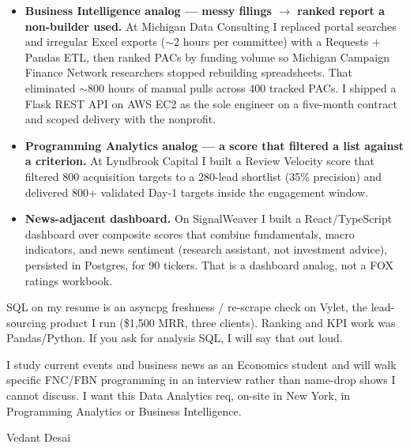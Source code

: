 \documentclass[11pt]{article}
\begin{document}
\begin{itemize}\setlength{\itemsep}{0.35em}\setlength{\parskip}{0pt}
\item \textbf{Business Intelligence analog --- messy filings $\rightarrow$ ranked report a non-builder used.} At Michigan Data Consulting I replaced portal searches and irregular Excel exports ($\sim$2 hours per committee) with a Requests + Pandas ETL, then ranked PACs by funding volume so Michigan Campaign Finance Network researchers stopped rebuilding spreadsheets. That eliminated $\sim$800 hours of manual pulls across 400 tracked PACs. I shipped a Flask REST API on AWS EC2 as the sole engineer on a five-month contract and scoped delivery with the nonprofit.

\item \textbf{Programming Analytics analog --- a score that filtered a list against a criterion.} At Lyndbrook Capital I built a Review Velocity score that filtered 800 acquisition targets to a 280-lead shortlist (35\% precision) and delivered 800+ validated Day-1 targets inside the engagement window.

\item \textbf{News-adjacent dashboard.} On SignalWeaver I built a React/TypeScript dashboard over composite scores that combine fundamentals, macro indicators, and news sentiment (research assistant, not investment advice), persisted in Postgres, for 90 tickers. That is a dashboard analog, not a FOX ratings workbook.
\end{itemize}

SQL on my resume is an asyncpg freshness / re-scrape check on Vylet, the lead-sourcing product I run (\$1,500 MRR, three clients). Ranking and KPI work was Pandas/Python. If you ask for analysis SQL, I will say that out loud.

I study current events and business news as an Economics student and will walk specific FNC/FBN programming in an interview rather than name-drop shows I cannot discuss. I want this Data Analytics req, on-site in New York, in Programming Analytics or Business Intelligence.

\vspace{0.8em}
\noindent Vedant Desai
\end{document}
